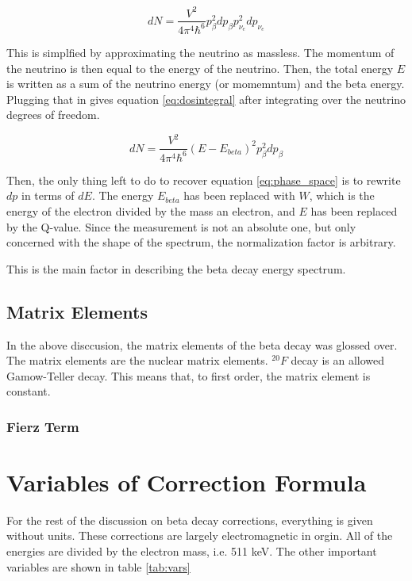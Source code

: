 \begin{equation}
	dN = \frac{V^{2}}{4\pi^{4}\hbar^{6}}p_{\beta}^{2}dp_{\beta}p_{\nu_{e}}^{2}dp_{\nu_{e}}
	\label{eq:dosspherical}
\end{equation}

This is simplfied by approximating the neutrino as massless.
The momentum of the neutrino is then equal to the energy of the neutrino.
Then, the total energy $E$ is written as a sum of the neutrino energy (or momemntum) and the beta energy.
Plugging that in gives equation \ref{eq:dosintegral} after integrating over the neutrino degrees of freedom. 

\begin{equation}
	dN = \frac{V^{2}}{4\pi^{4}\hbar^{6}}(E - E_{beta})^{2}p_{\beta}^{2}dp_{\beta}
	\label{eq:dosintegral}
\end{equation}

Then, the only thing left to do to recover equation \ref{eq:phase_space} is to rewrite $dp$ in terms of $dE$. 
The energy $E_{beta}$ has been replaced with $W$, which is the energy of the electron divided by the mass an electron, and $E$ has been replaced by the Q-value.
Since the measurement is not an absolute one, but only concerned with the shape of the spectrum, the normalization factor is arbitrary.

This is the main factor in describing the beta decay energy spectrum.

\subsection{Matrix Elements}
In the above disccusion, the matrix elements of the beta decay was glossed over.
The matrix elements are the nuclear matrix elements.
$^{20}F$ decay is an allowed Gamow-Teller decay.
This means that, to first order, the matrix element is constant. 

\subsubsection{Fierz Term}

\section{Variables of Correction Formula}

For the rest of the discussion on beta decay corrections, everything is given without units.
These corrections are largely electromagnetic in orgin.
All of the energies are divided by the electron mass, i.e. 511 keV.
The other important variables are shown in table \ref{tab:vars}

